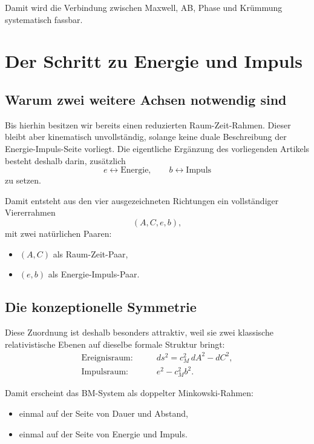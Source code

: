 \documentclass[11pt,a4paper]{article}
\theoremstyle{definition}
\theoremstyle{plain}
\begin{document}
	Damit wird die Verbindung zwischen Maxwell, AB, Phase und Krümmung systematisch fassbar.
	
	\section{Der Schritt zu Energie und Impuls}
	
	\subsection{Warum zwei weitere Achsen notwendig sind}
	
	Bis hierhin besitzen wir bereits einen reduzierten Raum-Zeit-Rahmen. Dieser bleibt aber kinematisch unvollständig, solange keine duale Beschreibung der Energie-Impuls-Seite vorliegt. Die eigentliche Ergänzung des vorliegenden Artikels besteht deshalb darin, zusätzlich
	\[
	e \leftrightarrow \text{Energie},
	\qquad
	b \leftrightarrow \text{Impuls}
	\]
	zu setzen.
	
	Damit entsteht aus den vier ausgezeichneten Richtungen ein vollständiger Viererrahmen
	\[
	(A,C,e,b),
	\]
	mit zwei natürlichen Paaren:
	\begin{itemize}[leftmargin=2em]
		\item $(A,C)$ als Raum-Zeit-Paar,
		\item $(e,b)$ als Energie-Impuls-Paar.
	\end{itemize}
	
	\subsection{Die konzeptionelle Symmetrie}
	
	Diese Zuordnung ist deshalb besonders attraktiv, weil sie zwei klassische relativistische Ebenen auf dieselbe formale Struktur bringt:
	\begin{align*}
		\text{Ereignisraum:} & \qquad ds^2 = c_M^2\, dA^2 - dC^2,\\
		\text{Impulsraum:} & \qquad e^2 - c_M^2 b^2.
	\end{align*}
	
	Damit erscheint das BM-System als doppelter Minkowski-Rahmen:
	\begin{itemize}[leftmargin=2em]
		\item einmal auf der Seite von Dauer und Abstand,
		\item einmal auf der Seite von Energie und Impuls.
	\end{itemize}
	
\end{document}
